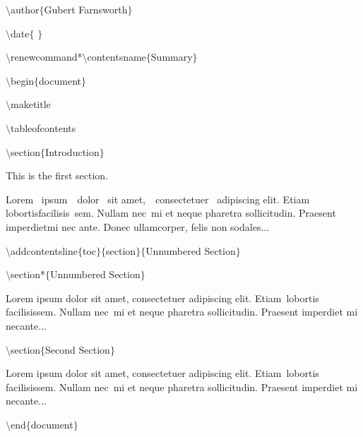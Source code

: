 $\setminus$author$ \{ $Gubert Farnsworth$ \} $\par

$\setminus$date$ \{ $ $ \} $\par
\vspace{\baselineskip}
$\setminus$renewcommand*$\setminus$contentsname$ \{ $Summary$ \} $\par

$\setminus$begin$ \{ $document$ \} $\par

$\setminus$maketitle\par

$\setminus$tableofcontents\par

$\setminus$section$ \{ $Introduction$ \} $\par
\vspace{\baselineskip}
This is the first section.\par

\vspace{\baselineskip}
Lorem~ ipsum~~dolor~ sit  amet,~~consectetuer~ adipiscing  elit. Etiam~ lobortisfacilisis~sem.  Nullam nec~mi et neque pharetra sollicitudin.  Praesent imperdietmi nec ante. Donec ullamcorper, felis non sodales...\par


\vspace{\baselineskip}
$\setminus$addcontentsline$ \{ $toc$ \} $$ \{ $section$ \} $$ \{ $Unnumbered Section$ \} $\par

$\setminus$section*$ \{ $Unnumbered Section$ \} $\par

\vspace{\baselineskip}
Lorem ipsum dolor sit amet, consectetuer adipiscing elit. Etiam~lobortis facilisissem.  Nullam nec~mi et neque pharetra sollicitudin.  Praesent imperdiet mi necante...\par


\vspace{\baselineskip}
$\setminus$section$ \{ $Second Section$ \} $\par


Lorem ipsum dolor sit amet, consectetuer adipiscing elit. Etiam~lobortis facilisissem.  Nullam nec~mi et neque pharetra sollicitudin.  Praesent imperdiet mi necante...\par




\noindent  \hspace*{0.5in}$\setminus$end$ \{ $document$ \} $\par

